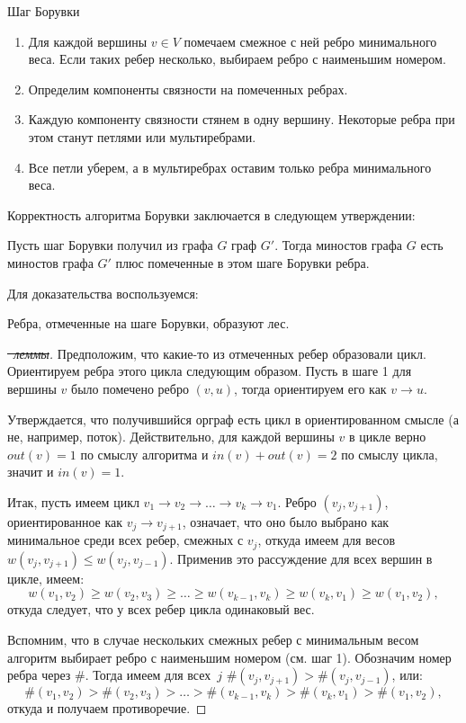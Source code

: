 \begin{algodescription}{Шаг Борувки}
\begin{enumerate}
    \item Для каждой вершины $v \in V$ помечаем смежное с ней ребро минимального веса. Если таких ребер несколько, выбираем ребро с наименьшим номером.
    \item Определим компоненты связности на помеченных ребрах.
    \item Каждую компоненту связности стянем в одну вершину. Некоторые ребра при этом станут петлями или мультиребрами.
    \item Все петли уберем, а в мультиребрах оставим только ребра минимального веса.
\end{enumerate}
\end{algodescription}

Корректность алгоритма Борувки заключается в следующем утверждении:

\begin{theorem*}
	Пусть шаг Борувки получил из графа $G$ граф $G'$. Тогда миностов графа $G$ есть миностов графа $G'$ плюс помеченные в этом шаге Борувки ребра.
\end{theorem*}
Для доказательства воспользуемся:
\begin{lemma*}
	Ребра, отмеченные на шаге Борувки, образуют лес.
\end{lemma*}
\begin{proof}[\sout{\achtung ~леммы}]

Предположим, что какие-то из отмеченных ребер образовали цикл. Ориентируем ребра этого цикла следующим образом. Пусть в шаге 1 для вершины $v$ было помечено ребро $(v, u)$, тогда ориентируем его как $v\rightarrow u$.

Утверждается, что получившийся орграф есть цикл в ориентированном смысле (а не, например, поток). Действительно, для каждой вершины $v$ в цикле верно $out(v) = 1$ по смыслу алгоритма и $in(v) + out(v) = 2$ по смыслу цикла, значит и $in(v) = 1$.

Итак, пусть имеем цикл $v_1 \rightarrow v_2 \rightarrow \ldots \rightarrow v_k \rightarrow v_1$. Ребро $(v_j, v_{j+1})$, ориентированное как $v_j \rightarrow v_{j+1}$, означает, что оно было выбрано как минимальное среди всех ребер, смежных с $v_j$, откуда имеем для весов $w(v_j, v_{j+1}) \leq w(v_j, v_{j-1})$. Применив это рассуждение для всех вершин в цикле, имеем: $$w(v_1, v_2) \geq w(v_2, v_3) \geq \ldots \geq w(v_{k-1}, v_k) \geq w(v_k, v_1) \geq w(v_1, v_2),$$
откуда следует, что у всех ребер цикла одинаковый вес.

Вспомним, что в случае нескольких смежных ребер с минимальным весом алгоритм выбирает ребро с наименьшим номером (см. шаг 1). Обозначим номер ребра через $\#$. Тогда имеем для всех~$j$ $\#(v_j, v_{j+1}) > \#(v_j, v_{j-1})$, или:
$$\#(v_1, v_2) > \#(v_2, v_3) > \ldots > \#(v_{k-1}, v_k) > \#(v_k, v_1) > \#(v_1, v_2),$$
откуда и получаем противоречие.
\end{proof}

